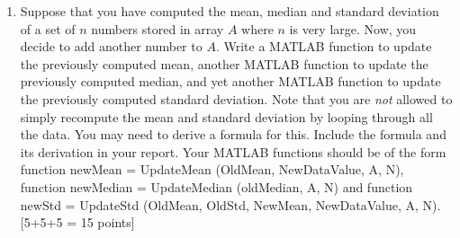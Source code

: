 \documentclass[11pt]{article}
\begin{document}
\begin{enumerate}
\item Suppose that you have computed the mean, median and standard deviation of a set of $n$ numbers stored in array $A$ where $n$ is very large. Now, you decide to add another number to $A$. Write a MATLAB function to update the previously computed mean, another MATLAB function to update the previously computed median, and yet another MATLAB function to update the previously computed standard deviation. Note that you are \emph{not} allowed to simply recompute the mean and standard deviation by looping through all the data. You may need to derive a formula for this. Include the formula and its derivation in your report. Your MATLAB functions should be of the form
function newMean = UpdateMean (OldMean, NewDataValue, A, N),  function newMedian = UpdateMedian (oldMedian, A, N)  and function newStd = UpdateStd (OldMean, OldStd, NewMean, NewDataValue, A, N). \textsf{[5+5+5 = 15 points]}


\end{enumerate}
\end{document}
